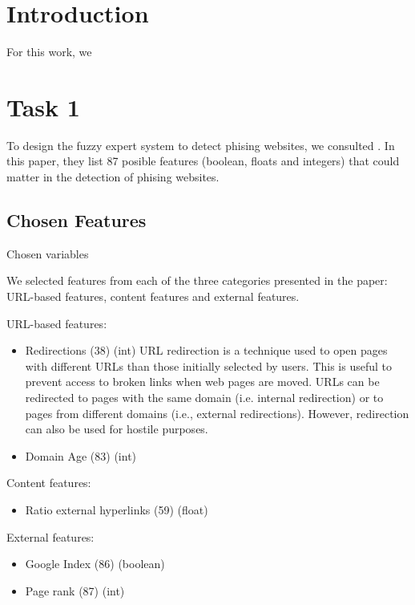 \documentclass[11pt]{article}
\begin{document}
\tableofcontents
\newpage

\section{Introduction}
For this work, we 

\section{Task 1}
To design the fuzzy expert system to detect phising websites, we consulted \cite{main_paper}. In this paper, they list 87 posible features (boolean, floats and integers) that could matter in the detection of phising websites. 

\subsection{Chosen Features}
Chosen variables

We selected features from each of the three categories presented in the paper: URL-based features, content features and external features. 

URL-based features:
\begin{itemize}
    \item Redirections (38) (int)
    URL redirection is a technique used to open pages with different URLs
than those initially selected by users. This is useful to prevent access to
broken links when web pages are moved. URLs can be redirected to pages
with the same domain (i.e. internal redirection) or to pages from different
domains (i.e., external redirections). However, redirection can also be used
for hostile purposes.
    \item Domain Age (83) (int)
\end{itemize}

Content features:
\begin{itemize}
    \item Ratio external hyperlinks (59) (float)
\end{itemize}

External features:
\begin{itemize}
    \item Google Index (86) (boolean)
    \item Page rank (87) (int)
\end{itemize}
\end{document}
